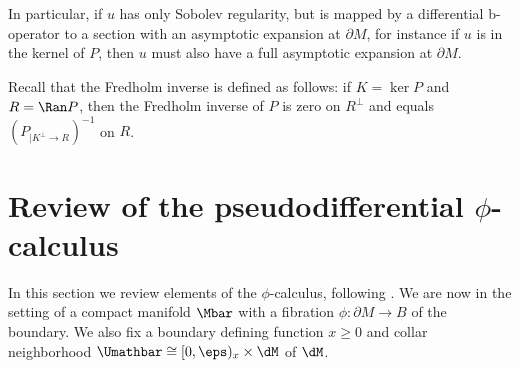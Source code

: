 In particular, if $u$ has only Sobolev regularity, but is mapped by a differential b\nobreakdash-operator
to a section with an asymptotic expansion at $\partial M$, for instance if $u$ is in
the kernel of $P$, then $u$ must also have a full asymptotic expansion at $\partial M$.

Recall that the Fredholm inverse is defined as follows: if $K= \ker P$ and $R=\Ran P$, then the Fredholm inverse of $P$ is zero on $R^\perp$ and equals $(P_{|K^\perp\to R})^{-1}$ on $R$.

\section{Review of the pseudodifferential \texorpdfstring{$\phi$}{phi}-calculus}\label{sec:phi-calc}
In this section we review elements of the $\phi$-calculus,
following \cite{mazzeo1998pseudodifferential}.
We are now in the setting
of a compact manifold $\Mbar$ with a fibration $\phi:\partial M\to B$ of the boundary. We also fix a boundary defining function $x \geq 0$ and collar neighborhood $\Umathbar\cong [0,\eps)_x\times\dM$ of $\dM$.

